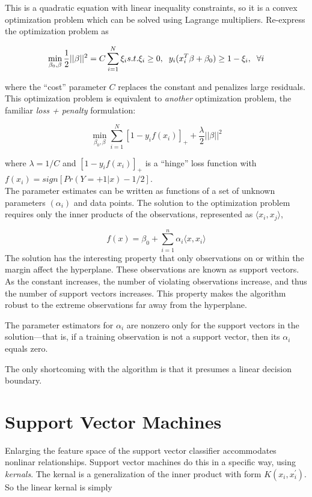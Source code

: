 \documentclass[]{book}
\begin{document}
This is a quadratic equation with linear inequality constraints, so it is a convex optimization problem which can be solved using Lagrange multipliers. Re-express the optimization problem as

\[
\min_{\beta_0, \beta} \frac{1}{2}||\beta||^2 = C\sum_{i = 1}^N \xi_i \\
s.t. \xi_i \ge 0, \hspace{2mm} y_i(x_i^T\beta + \beta_0) \ge 1 - \xi_i, \hspace{2mm} \forall i
\]

where the ``cost'' parameter \(C\) replaces the constant and penalizes large residuals. This optimization problem is equivalent to \emph{another} optimization problem, the familiar \emph{loss + penalty} formulation:

\[\min_{\beta_0, \beta} \sum_{i=1}^N{[1 - y_if(x_i)]_+} + \frac{\lambda}{2} ||\beta||^2 \]

where \(\lambda = 1 / C\) and \([1 - y_if(x_i)]_+\) is a ``hinge'' loss function with \(f(x_i) = sign[Pr(Y = +1|x) - 1 / 2]\).\\
The parameter estimates can be written as functions of a set of unknown parameters \((\alpha_i)\) and data points. The solution to the optimization problem requires only the inner products of the observations, represented as \(\langle x_i, x_j \rangle\),

\[f(x) = \beta_0 + \sum_{i = 1}^n {\alpha_i \langle x, x_i \rangle}\]
The solution has the interesting property that only observations on or within the margin affect the hyperplane. These observations are known as support vectors. As the constant increases, the number of violating observations increase, and thus the number of support vectors increases. This property makes the algorithm robust to the extreme observations far away from the hyperplane.

The parameter estimators for \(\alpha_i\) are nonzero only for the support vectors in the solution---that is, if a training observation is not a support vector, then its \(\alpha_i\) equals zero.

The only shortcoming with the algorithm is that it presumes a linear decision boundary.

\hypertarget{support-vector-machines-1}{%
\section{Support Vector Machines}\label{support-vector-machines-1}}

Enlarging the feature space of the support vector classifier accommodates nonlinar relationships. Support vector machines do this in a specific way, using \emph{kernals}. The kernal is a generalization of the inner product with form \(K(x_i, x_i^{'})\). So the linear kernal is simply
\end{document}
